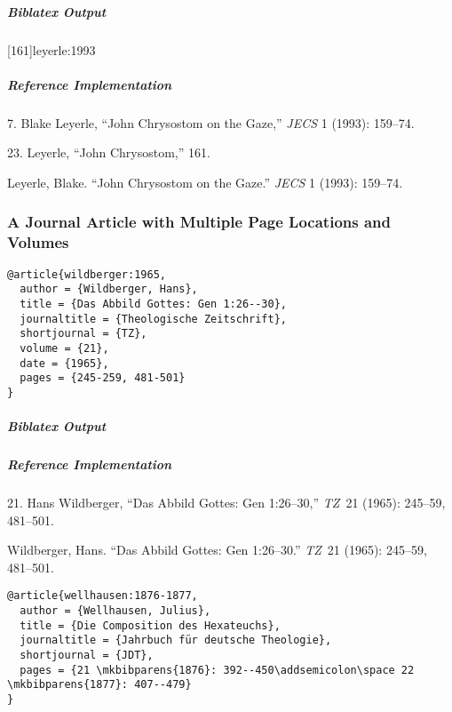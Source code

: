 \documentclass[a4paper]{article}
\newenvironment{biboutput}{%
  \subparagraph{Biblatex Output}
}{\color{black}}
\newenvironment{refimp}{%
  \subparagraph{Reference Implementation}
  \color{reference-colour}
  \rm
}{\par\color{black}}
\begin{document}
\begin{biboutput}
  [161]{leyerle:1993}
\end{biboutput}

\begin{refimp}
  \hspace*{\bibindent}7. Blake Leyerle, “John Chrysostom on the Gaze,”
  \emph{JECS} 1 (1993): 159–74.

  \hspace*{\bibindent}23. Leyerle, “John Chrysostom,” 161.

  \hangindent\bibindent Leyerle, Blake. “John Chrysostom on the Gaze.”
  \emph{JECS} 1 (1993): 159–74.

\end{refimp}

\subsubsection{A Journal Article with Multiple Page Locations and Volumes}

\begin{lstlisting}
@article{wildberger:1965,
  author = {Wildberger, Hans},
  title = {Das Abbild Gottes: Gen 1:26--30},
  journaltitle = {Theologische Zeitschrift},
  shortjournal = {TZ},
  volume = {21},
  date = {1965},
  pages = {245-259, 481-501}
}
\end{lstlisting}

\begin{biboutput}
\end{biboutput}

\begin{refimp}
  \hspace*{\bibindent}21. Hans Wildberger, “Das Abbild Gottes: Gen 1:26–30,”
  \emph{TZ}~21 (1965): 245–59, 481–501.

  \hangindent\bibindent Wildberger, Hans. “Das Abbild Gottes: Gen 1:26–30.”
  \emph{TZ}~21 (1965): 245–59, 481–501.

\end{refimp}

\begin{lstlisting}
@article{wellhausen:1876-1877,
  author = {Wellhausen, Julius},
  title = {Die Composition des Hexateuchs},
  journaltitle = {Jahrbuch für deutsche Theologie},
  shortjournal = {JDT},
  pages = {21 \mkbibparens{1876}: 392--450\addsemicolon\space 22 \mkbibparens{1877}: 407--479}
}
\end{lstlisting}
\end{document}
